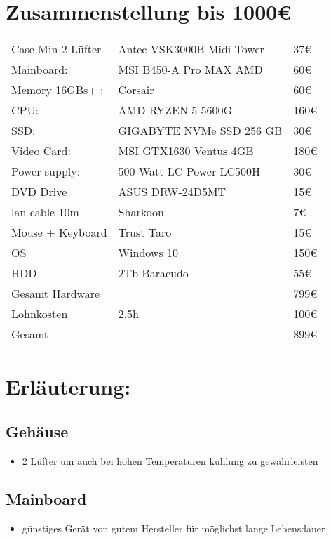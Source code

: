 \documentclass[11pt]{article}
\begin{document}
\section{Zusammenstellung bis 1000€}
\label{sec:orgf86db36}
\begin{center}
\begin{tabular}{lll}
\hline
Case Min 2 Lüfter & Antec VSK3000B Midi Tower & 37€\\
Mainboard: & MSI B450-A Pro MAX AMD & 60€\\
Memory 16GBs+ : & Corsair & 60€\\
CPU: & AMD RYZEN 5 5600G & 160€\\
SSD: & GIGABYTE NVMe SSD 256 GB & 30€\\
Video Card: & MSI GTX1630 Ventus 4GB & 180€\\
Power supply: & 500 Watt LC-Power LC500H & 30€\\
DVD Drive & ASUS DRW-24D5MT & 15€\\
lan cable 10m & Sharkoon & 7€\\
Mouse + Keyboard & Trust Taro & 15€\\
OS & Windows 10 & 150€\\
HDD & 2Tb Baracudo & 55€\\
\hline
Gesamt Hardware &  & 799€\\
Lohnkosten & 2,5h & 100€\\
\hline
Gesamt &  & 899€\\
\hline
\end{tabular}
\end{center}

\section{Erläuterung:}
\label{sec:org868e86f}
\subsection{Gehäuse}
\label{sec:orged20335}
\begin{itemize}
\item 2 Lüfter um auch bei hohen Temperaturen kühlung zu gewährleisten
\end{itemize}
\subsection{Mainboard}
\label{sec:org96b763c}
\begin{itemize}
\item günstiges Gerät von gutem Hersteller für möglichst lange Lebensdauer
\end{itemize}
\end{document}
